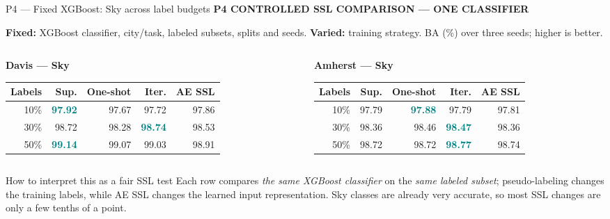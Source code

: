 \documentclass[aspectratio=169,11pt]{beamer}
\newcommand{\sectiontag}[1]{{\footnotesize\usebeamercolor[fg]{structure}\textbf{#1}}\par\vspace{0.10cm}}
\newcommand{\smallmuted}[1]{{\footnotesize\color{slate}#1\par}}
\begin{document}
\begin{frame}{P4 — Fixed XGBoost: Sky across label budgets}
\sectiontag{P4 \quad CONTROLLED SSL COMPARISON — ONE CLASSIFIER}
\smallmuted{\textbf{Fixed:} XGBoost classifier, city/task, labeled subsets, splits and seeds. \textbf{Varied:} training strategy. BA (\%) over three seeds; higher is better.}
\vspace{0.20cm}
\begin{columns}[T,totalwidth=\textwidth]
\begin{column}{0.49\textwidth}
\textbf{Davis — Sky}\par\vspace{0.10cm}
{\fontsize{8.2}{9.6}\selectfont\setlength{\tabcolsep}{2.9pt}\renewcommand{\arraystretch}{1.40}
\begin{tabular}{@{}rrrrr@{}}\toprule
\textbf{Labels} & \textbf{Sup.} & \textbf{One-shot} & \textbf{Iter.} & \textbf{AE SSL}\\\midrule
10\% & \textcolor{teal}{\textbf{97.92}} & 97.67 & 97.72 & 97.86\\
30\% & 98.72 & 98.28 & \textcolor{teal}{\textbf{98.74}} & 98.53\\
50\% & \textcolor{teal}{\textbf{99.14}} & 99.07 & 99.03 & 98.91\\
\bottomrule\end{tabular}}
\end{column}
\begin{column}{0.49\textwidth}
\textbf{Amherst — Sky}\par\vspace{0.10cm}
{\fontsize{8.2}{9.6}\selectfont\setlength{\tabcolsep}{2.9pt}\renewcommand{\arraystretch}{1.40}
\begin{tabular}{@{}rrrrr@{}}\toprule
\textbf{Labels} & \textbf{Sup.} & \textbf{One-shot} & \textbf{Iter.} & \textbf{AE SSL}\\\midrule
10\% & 97.79 & \textcolor{teal}{\textbf{97.88}} & 97.79 & 97.81\\
30\% & 98.36 & 98.46 & \textcolor{teal}{\textbf{98.47}} & 98.36\\
50\% & 98.72 & 98.72 & \textcolor{teal}{\textbf{98.77}} & 98.74\\
\bottomrule\end{tabular}}
\end{column}
\end{columns}
\vspace{0.25cm}
\begin{block}{How to interpret this as a fair SSL test}
\footnotesize Each row compares \emph{the same XGBoost classifier} on the \emph{same labeled subset}; pseudo-labeling changes the training labels, while AE SSL changes the learned input representation. Sky classes are already very accurate, so most SSL changes are only a few tenths of a point.
\end{block}
\end{frame}
\end{document}
